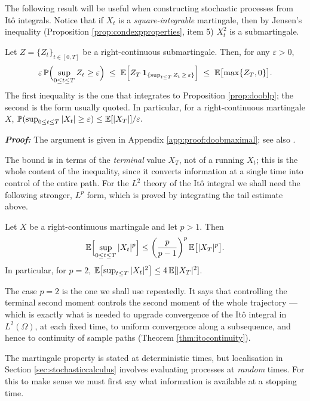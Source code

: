 The following result will be useful when constructing stochastic processes from Itô integrals. Notice that if $X_t$ is a \emph{square-integrable} martingale, then by Jensen's inequality (Proposition \ref{prop:condexpproperties}, item 5) $X_t^2$ is a submartingale.
 
\begin{proposition}\label{prop:doobmaximal}
    Let $Z = \{Z_t\}_{t\in[0,T]}$ be a right-continuous submartingale. Then, for any $\varepsilon > 0$,
    $$
    \varepsilon\,\mathbb{P}\Bigl(\sup_{0\leq t\leq T} Z_t \geq \varepsilon\Bigr)
    \;\leq\; \mathbb{E}\Bigl[Z_T\,\mathbf{1}_{\{\sup_{t\leq T} Z_t \,\geq\, \varepsilon\}}\Bigr]
    \;\leq\; \mathbb{E}\bigl[\max\{Z_T,0\}\bigr].
    $$
    The first inequality is the one that integrates to Proposition \ref{prop:dooblp}; the second is
    the form usually quoted.
    In particular, for a right-continuous martingale $X$, $\mathbb{P}(\sup_{0\leq t\leq T} |X_t| \geq \varepsilon) \leq \mathbb{E}[|X_T|]/\varepsilon.$
\end{proposition}
\textbf{\textit{Proof:}} The argument is given in Appendix \ref{app:proof:doobmaximal}; see also \cite[Thm.\ 4.5.1]{kuo2006}. \qedfilledtext

The bound is in terms of the \emph{terminal} value $X_T$, not of a running $X_t$; this is the whole content of the inequality, since it converts information at a single time into control of the entire path. For the $L^2$ theory of the Itô integral we shall need the following stronger, $L^p$ form, which is proved by integrating the tail estimate above.

\begin{proposition}\label{prop:dooblp}
Let $X$ be a right-continuous martingale and let $p > 1$. Then
\[
\mathbb{E}\Bigl[\sup_{0 \leq t \leq T}|X_t|^p\Bigr] \leq \left(\frac{p}{p-1}\right)^{p} \mathbb{E}\bigl[|X_T|^p\bigr].
\]
In particular, for $p=2$, $\mathbb{E}\bigl[\sup_{t\leq T}|X_t|^2\bigr] \leq 4\,\mathbb{E}[|X_T|^2]$. \qedopentext
\end{proposition}

The case $p=2$ is the one we shall use repeatedly. It says that controlling the terminal second moment controls the second moment of the whole trajectory --- which is exactly what is needed to upgrade convergence of the Itô integral in $L^2(\Omega)$, at each fixed time, to uniform convergence along a subsequence, and hence to continuity of sample paths (Theorem \ref{thm:itocontinuity}).

The martingale property is stated at deterministic times, but
localisation in Section \ref{sec:stochasticcalculus} involves evaluating processes at \emph{random} times. For this 
to make sense we must first say what information is available at a stopping time.


